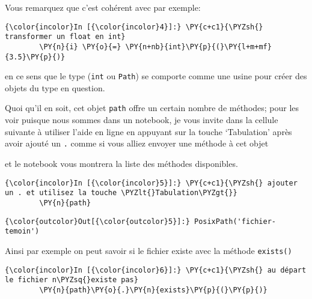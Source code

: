     Vous remarquez que c'est cohérent avec par exemple:

    \begin{Verbatim}[commandchars=\\\{\},frame=single,framerule=0.3mm,rulecolor=\color{cellframecolor}]
{\color{incolor}In [{\color{incolor}4}]:} \PY{c+c1}{\PYZsh{} transformer un float en int}
        \PY{n}{i} \PY{o}{=} \PY{n+nb}{int}\PY{p}{(}\PY{l+m+mf}{3.5}\PY{p}{)}
\end{Verbatim}


    en ce sens que le type (\texttt{int} ou \texttt{Path}) se comporte comme
une usine pour créer des objets du type en question.

    Quoi qu'il en soit, cet objet \texttt{path} offre un certain nombre de
méthodes; pour les voir puisque nous sommes dans un notebook, je vous
invite dans la cellule suivante à utiliser l'aide en ligne en appuyant
sur la touche `Tabulation' après avoir ajouté un \texttt{.} comme si
vous alliez envoyer une méthode à cet objet

\begin{Shaded}
\begin{Highlighting}[frame=lines,framerule=0.6mm,rulecolor=\color{asisframecolor}]
\end{Highlighting}
\end{Shaded}

et le notebook vous montrera la liste des méthodes disponibles.

    \begin{Verbatim}[commandchars=\\\{\},frame=single,framerule=0.3mm,rulecolor=\color{cellframecolor}]
{\color{incolor}In [{\color{incolor}5}]:} \PY{c+c1}{\PYZsh{} ajouter un . et utilisez la touche \PYZlt{}Tabulation\PYZgt{}}
        \PY{n}{path}
\end{Verbatim}


\begin{Verbatim}[commandchars=\\\{\},frame=single,framerule=0.3mm,rulecolor=\color{cellframecolor}]
{\color{outcolor}Out[{\color{outcolor}5}]:} PosixPath('fichier-temoin')
\end{Verbatim}
            
    Ainsi par exemple on peut savoir si le fichier existe avec la méthode
\texttt{exists()}

    \begin{Verbatim}[commandchars=\\\{\},frame=single,framerule=0.3mm,rulecolor=\color{cellframecolor}]
{\color{incolor}In [{\color{incolor}6}]:} \PY{c+c1}{\PYZsh{} au départ le fichier n\PYZsq{}existe pas}
        \PY{n}{path}\PY{o}{.}\PY{n}{exists}\PY{p}{(}\PY{p}{)}
\end{Verbatim}


